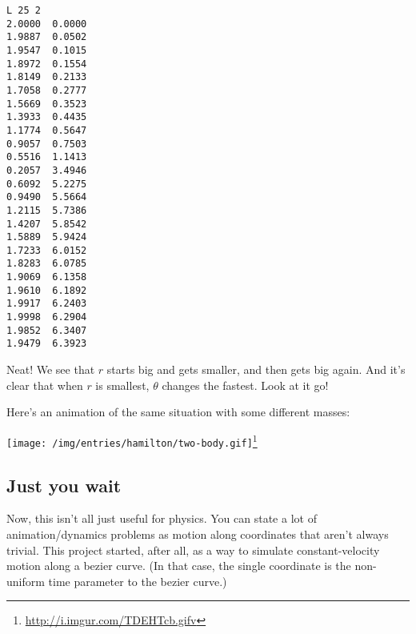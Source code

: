 \documentclass[]{article}
\newenvironment{Shaded}{}{}
\newcommand{\DataTypeTok}[1]{\textcolor[rgb]{0.56,0.13,0.00}{{#1}}}
\newcommand{\DecValTok}[1]{\textcolor[rgb]{0.25,0.63,0.44}{{#1}}}
\newcommand{\FloatTok}[1]{\textcolor[rgb]{0.25,0.63,0.44}{{#1}}}
\newcommand{\CommentTok}[1]{\textcolor[rgb]{0.38,0.63,0.69}{\textit{{#1}}}}
\newcommand{\OtherTok}[1]{\textcolor[rgb]{0.00,0.44,0.13}{{#1}}}
\newcommand{\FunctionTok}[1]{\textcolor[rgb]{0.02,0.16,0.49}{{#1}}}
\newcommand{\NormalTok}[1]{{#1}}
\renewcommand{\href}[2]{#2\footnote{\url{#1}}}
\begin{document}
\begin{Shaded}
\end{Shaded}

\begin{verbatim}
L 25 2
2.0000  0.0000
1.9887  0.0502
1.9547  0.1015
1.8972  0.1554
1.8149  0.2133
1.7058  0.2777
1.5669  0.3523
1.3933  0.4435
1.1774  0.5647
0.9057  0.7503
0.5516  1.1413
0.2057  3.4946
0.6092  5.2275
0.9490  5.5664
1.2115  5.7386
1.4207  5.8542
1.5889  5.9424
1.7233  6.0152
1.8283  6.0785
1.9069  6.1358
1.9610  6.1892
1.9917  6.2403
1.9998  6.2904
1.9852  6.3407
1.9479  6.3923
\end{verbatim}

Neat! We see that \(r\) starts big and gets smaller, and then gets big again.
And it's clear that when \(r\) is smallest, \(\theta\) changes the fastest. Look
at it go!

Here's an animation of the same situation with some different masses:

\href{http://i.imgur.com/TDEHTcb.gifv}{\texttt{[image: /img/entries/hamilton/two-body.gif]}}

\subsection{Just you wait}\label{just-you-wait}

Now, this isn't all just useful for physics. You can state a lot of
animation/dynamics problems as motion along coordinates that aren't always
trivial. This project started, after all, as a way to simulate constant-velocity
motion along a bezier curve. (In that case, the single coordinate is the
non-uniform time parameter to the bezier curve.)
\end{document}
